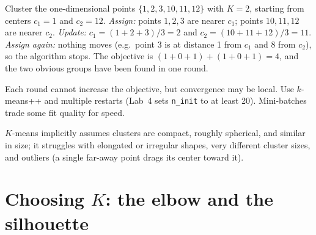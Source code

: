 \begin{mlfigure}
\end{mlfigure}

\begin{workedexample}
Cluster the one-dimensional points $\{1,2,3,10,11,12\}$ with $K=2$, starting from centers $c_1=1$ and $c_2=12$.
\emph{Assign:} points $1,2,3$ are nearer $c_1$; points $10,11,12$ are nearer $c_2$.
\emph{Update:} $c_1=(1+2+3)/3=2$ and $c_2=(10+11+12)/3=11$.
\emph{Assign again:} nothing moves (e.g.\ point 3 is at distance 1 from $c_1$ and 8 from $c_2$), so the algorithm stops. The objective is $(1+0+1)+(1+0+1)=4$, and the two obvious groups have been found in one round.
\end{workedexample}

Each round cannot increase the objective, but convergence may be local. Use $k$-means++ and multiple restarts (Lab~4 sets \texttt{n\_init} to at least 20). Mini-batches trade some fit quality for speed.

$K$-means implicitly assumes clusters are compact, roughly spherical, and similar in size; it struggles with elongated or irregular shapes, very different cluster sizes, and outliers (a single far-away point drags its center toward it).

\section{Choosing $K$: the elbow and the silhouette}

